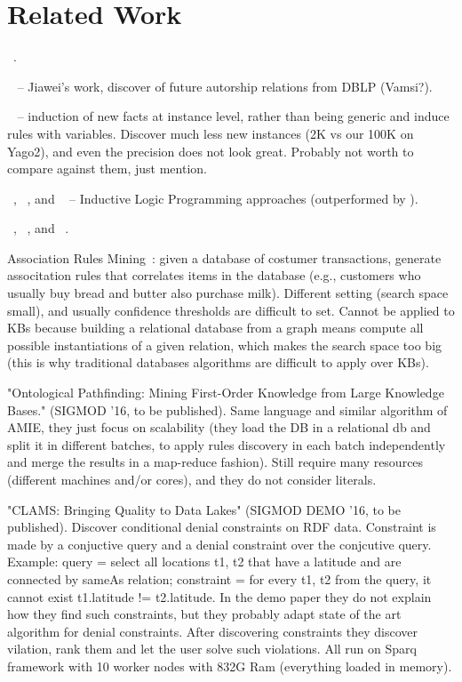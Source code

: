 \section{Related Work}
\amie~\cite{galarraga2015fast}.

~\cite{zhu2011mining} -- Jiawei's work, discover of future autorship relations from DBLP (Vamsi?).

~\cite{abedjan2014amending} -- induction of new facts at instance level, rather than being generic and induce rules with variables. Discover much less new instances (2K vs our 100K on Yago2), and even the precision does not look great. Probably not worth to compare against them, just mention.

~\cite{muggleton1995inverse}, ~\cite{dehaspe1999discovery}, and ~\cite{schoenmackers2010learning} -- Inductive Logic Programming approaches (outperformed by \amie).

\yago~\cite{suchanek2007yago}, \dbpedia~\cite{bizer2009dbpedia}, and \wikidata~\cite{vrandevcic2014wikidata}.

Association Rules Mining~\cite{agrawal1993mining}: given a database of costumer transactions, generate associtation rules that correlates items in the database (e.g., customers who usually buy bread and butter also purchase milk). Different setting (search space small), and usually confidence thresholds are difficult to set. Cannot be applied to KBs because building a relational database from a graph means compute all possible instantiations of a given relation, which makes the search space too big (this is why traditional databases algorithms are difficult to apply over KBs).

"Ontological Pathfinding: Mining First-Order Knowledge from Large Knowledge Bases." (SIGMOD '16, to be published). Same language and similar algorithm of AMIE, they just focus on scalability (they load the DB in a relational db and split it in different batches, to apply rules discovery in each batch independently and merge the results in a map-reduce fashion). Still require many resources (different machines and/or cores), and they do not consider literals.

"CLAMS: Bringing Quality to Data Lakes" (SIGMOD DEMO '16, to be published). Discover conditional denial constraints on RDF data. Constraint is made by a conjuctive query and a denial constraint over the conjcutive query. Example: query = select all locations t1, t2 that have a latitude and are connected by sameAs relation; constraint = for every t1, t2 from the query, it cannot exist t1.latitude != t2.latitude. In the demo paper they do not explain how they find such constraints, but they probably adapt state of the art algorithm for denial constraints. After discovering constraints they discover vilation, rank them and let the user solve such violations. All run on Sparq framework with 10 worker nodes with 832G Ram (everything loaded in memory).

